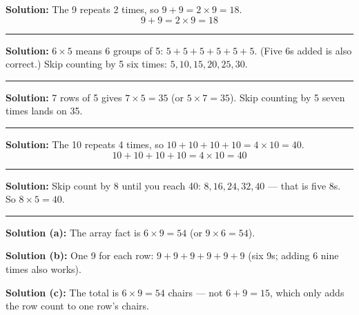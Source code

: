 \documentclass[12pt]{article}
\begin{document}
\textbf{Solution:} The 9 repeats 2 times, so $9 + 9 = 2 \times 9 = 18$.
\[ \boxed{9 + 9 = 2 \times 9 = 18} \]

\noindent\rule{\linewidth}{0.2pt}


\textbf{Solution:} $6 \times 5$ means 6 groups of 5: $5 + 5 + 5 + 5 + 5 + 5$. (Five 6s added is also correct.) Skip counting by 5 six times: $5, 10, 15, 20, 25, 30$. 

\noindent\rule{\linewidth}{0.2pt}


\textbf{Solution:} 7 rows of 5 gives $7 \times 5 = 35$ (or $5 \times 7 = 35$). Skip counting by 5 seven times lands on 35. 

\noindent\rule{\linewidth}{0.2pt}


\textbf{Solution:} The 10 repeats 4 times, so $10 + 10 + 10 + 10 = 4 \times 10 = 40$.
\[ \boxed{10 + 10 + 10 + 10 = 4 \times 10 = 40} \]

\noindent\rule{\linewidth}{0.2pt}


\textbf{Solution:} Skip count by 8 until you reach 40: $8, 16, 24, 32, 40$ --- that is five 8s. So $8 \times 5 = 40$. 

\noindent\rule{\linewidth}{0.2pt}


\textbf{Solution (a):} The array fact is $6 \times 9 = 54$ (or $9 \times 6 = 54$).

\textbf{Solution (b):} One 9 for each row: $9 + 9 + 9 + 9 + 9 + 9$ (six 9s; adding 6 nine times also works).

\textbf{Solution (c):} The total is $6 \times 9 = 54$ chairs --- not $6 + 9 = 15$, which only adds the row count to one row's chairs. 
\end{document}
